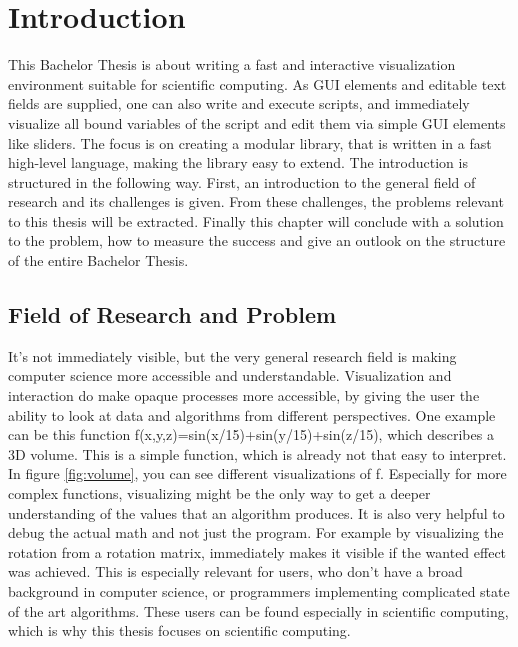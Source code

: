\section{Introduction}
This Bachelor Thesis is about writing a fast and interactive visualization environment suitable for scientific computing. 
As GUI elements and editable text fields are supplied, one can also write and execute scripts, and immediately visualize all bound variables of the script and edit them via simple GUI elements like sliders. The focus is on creating a modular library, that is written in a fast high-level language, making the library easy to extend.
The introduction is structured in the following way.
First, an introduction to the general field of research and its challenges is given. 
From these challenges, the problems relevant to this thesis will be extracted.
Finally this chapter will conclude with a solution to the problem, how to measure the success and give an outlook on the structure of the entire Bachelor Thesis.
 
\subsection{Field of Research and Problem}


It's not immediately visible, but the very general research field is making computer science more accessible and understandable. 
Visualization and interaction do make opaque processes more accessible, by giving the user the ability to look at data and algorithms from different perspectives. 
One example can be this function f(x,y,z)=sin(x/15)+sin(y/15)+sin(z/15), which describes a 3D volume. 
This is a simple function, which is already not that easy to interpret. In figure \ref{fig:volume}, you can see different visualizations of f. Especially for more complex functions, visualizing might be the only way to get a deeper understanding of the values that an algorithm produces.
It is also very helpful to debug the actual math and not just the program. For example by visualizing the rotation from a rotation matrix, immediately makes it visible if the wanted effect was achieved.
This is especially relevant for users, who don't have a broad background in computer science, or programmers implementing complicated state of the art algorithms.
These users can be found especially in scientific computing, which is why this thesis focuses on scientific computing. 

